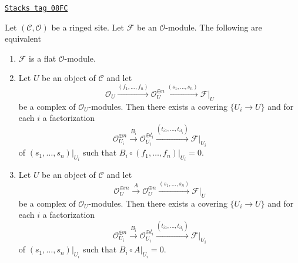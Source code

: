 \begin{lemma}[Flat eq]
\label{sites-modules-lemma-flat-eq}
\href{https://stacks.math.columbia.edu/tag/08FC}{\texttt{Stacks tag 08FC}}

Let $(\mathcal{C}, \mathcal{O})$ be a ringed site. Let $\mathcal{F}$ be an
$\mathcal{O}$-module. The following are equivalent
\begin{enumerate}
\item $\mathcal{F}$ is a flat $\mathcal{O}$-module.
\item Let $U$ be an object of $\mathcal{C}$ and let
$$
\mathcal{O}_U \xrightarrow{(f_1, \ldots, f_n)}
\mathcal{O}_U^{\oplus n} \xrightarrow{(s_1, \ldots, s_n)}
\mathcal{F}|_U
$$
be a complex of $\mathcal{O}_U$-modules. Then there exists a covering
$\{U_i \to U\}$ and for each $i$ a factorization
$$
\mathcal{O}_{U_i}^{\oplus n}
\xrightarrow{B_i}
\mathcal{O}_{U_i}^{\oplus l_i} \xrightarrow{(t_{i1}, \ldots, t_{il_i})}
\mathcal{F}|_{U_i}
$$
of $(s_1, \ldots, s_n)|_{U_i}$ such that
$B_i \circ (f_1, \ldots, f_n)|_{U_i} = 0$.
\item Let $U$ be an object of $\mathcal{C}$ and let
$$
\mathcal{O}_U^{\oplus m} \xrightarrow{A}
\mathcal{O}_U^{\oplus n} \xrightarrow{(s_1, \ldots, s_n)}
\mathcal{F}|_U
$$
be a complex of $\mathcal{O}_U$-modules. Then there exists a covering
$\{U_i \to U\}$ and for each $i$ a factorization
$$
\mathcal{O}_{U_i}^{\oplus n}
\xrightarrow{B_i}
\mathcal{O}_{U_i}^{\oplus l_i} \xrightarrow{(t_{i1}, \ldots, t_{il_i})}
\mathcal{F}|_{U_i}
$$
of $(s_1, \ldots, s_n)|_{U_i}$ such that
$B_i \circ A|_{U_i} = 0$.
\end{enumerate}
\end{lemma}

